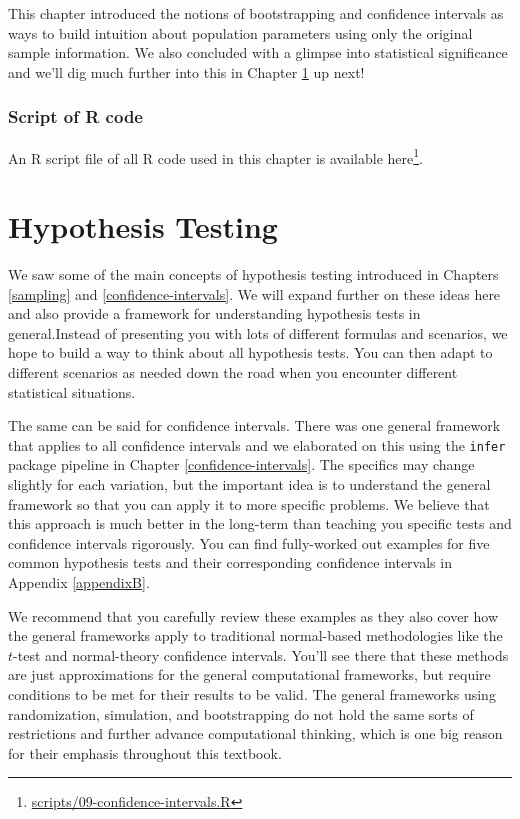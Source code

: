\documentclass[12pt,]{krantz}
\renewcommand{\href}[2]{#2\footnote{\url{#1}}}
\theoremstyle{definition}
\theoremstyle{definition}
\theoremstyle{definition}
\theoremstyle{remark}
\begin{document}
This chapter introduced the notions of bootstrapping and confidence
intervals as ways to build intuition about population parameters using
only the original sample information. We also concluded with a glimpse
into statistical significance and we'll dig much further into this in
Chapter \ref{hypothesis-testing} up next!

\subsection{Script of R code}\label{script-of-r-code-6}

An R script file of all R code used in this chapter is available
\href{scripts/09-confidence-intervals.R}{here}.

\chapter{Hypothesis Testing}\label{hypothesis-testing}

We saw some of the main concepts of hypothesis testing introduced in
Chapters \ref{sampling} and \ref{confidence-intervals}. We will expand
further on these ideas here and also provide a framework for
understanding hypothesis tests in general.Instead of presenting you with
lots of different formulas and scenarios, we hope to build a way to
think about all hypothesis tests. You can then adapt to different
scenarios as needed down the road when you encounter different
statistical situations.

The same can be said for confidence intervals. There was one general
framework that applies to all confidence intervals and we elaborated on
this using the \texttt{infer} package pipeline in Chapter
\ref{confidence-intervals}. The specifics may change slightly for each
variation, but the important idea is to understand the general framework
so that you can apply it to more specific problems. We believe that this
approach is much better in the long-term than teaching you specific
tests and confidence intervals rigorously. You can find fully-worked out
examples for five common hypothesis tests and their corresponding
confidence intervals in Appendix \ref{appendixB}.

We recommend that you carefully review these examples as they also cover
how the general frameworks apply to traditional normal-based
methodologies like the \(t\)-test and normal-theory confidence
intervals. You'll see there that these methods are just approximations
for the general computational frameworks, but require conditions to be
met for their results to be valid. The general frameworks using
randomization, simulation, and bootstrapping do not hold the same sorts
of restrictions and further advance computational thinking, which is one
big reason for their emphasis throughout this textbook.
\end{document}
